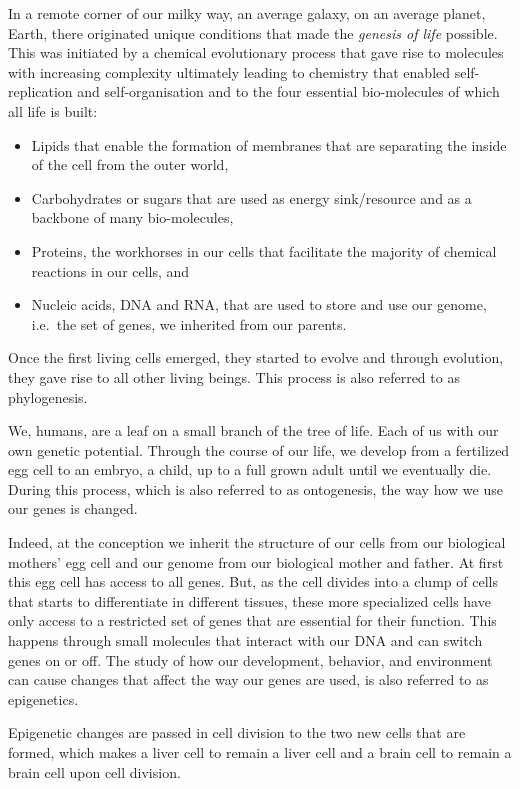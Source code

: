 \documentclass[
  11pt,
]{book}
\providecommand{\tightlist}{%
  \setlength{\itemsep}{0pt}\setlength{\parskip}{0pt}}
\begin{document}
In a remote corner of our milky way, an average galaxy, on an average planet, Earth, there originated unique conditions that made the \emph{genesis of life} possible.
This was initiated by a chemical evolutionary process that gave rise to molecules with increasing complexity ultimately leading to chemistry that enabled self-replication and self-organisation and to the four essential bio-molecules of which all life is built:

\begin{itemize}
\tightlist
\item
  Lipids that enable the formation of membranes that are separating the inside of the cell from the outer world,
\item
  Carbohydrates or sugars that are used as energy sink/resource and as a backbone of many bio-molecules,
\item
  Proteins, the workhorses in our cells that facilitate the majority of chemical reactions in our cells, and
\item
  Nucleic acids, DNA and RNA, that are used to store and use our genome, i.e.~the set of genes, we inherited from our parents.
\end{itemize}

Once the first living cells emerged, they started to evolve and through evolution, they gave rise to all other living beings. This process is also referred to as phylogenesis.

We, humans, are a leaf on a small branch of the tree of life. Each of us with our own genetic potential. Through the course of our life, we develop from a fertilized egg cell to an embryo, a child, up to a full grown adult until we eventually die. During this process, which is also referred to as ontogenesis, the way how we use our genes is changed.

Indeed, at the conception we inherit the structure of our cells from our biological mothers' egg cell and our genome from our biological mother and father. At first this egg cell has access to all genes. But, as the cell divides into a clump of cells that starts to differentiate in different tissues, these more specialized cells have only access to a restricted set of genes that are essential for their function. This happens through small molecules that interact with our DNA and can switch genes on or off.
The study of how our development, behavior, and environment can cause changes that affect the way our genes are used, is also referred to as epigenetics.

Epigenetic changes are passed in cell division to the two new cells that are formed, which makes a liver cell to remain a liver cell and a brain cell to remain a brain cell upon cell division.
\end{document}
